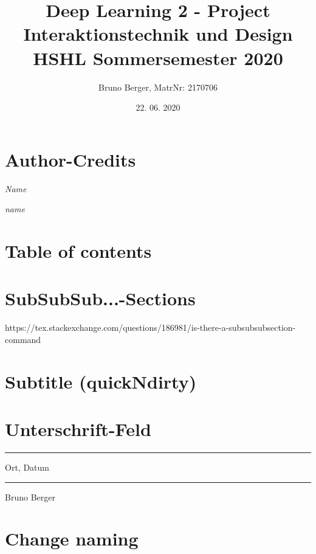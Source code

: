 \section{Author-Credits}

\hfill\textnormal{\emph{Name}}

\begin{flushright}
\emph{name}
\end{flushright}

\section{Table of contents}



\section{SubSubSub...-Sections}

https://tex.stackexchange.com/questions/186981/is-there-a-subsubsubsection-command


\section{Subtitle (quickNdirty)}

\title{Deep Learning 2 - Project\\
    \vspace{+14pt}
        \Large Interaktionstechnik und Design \\
        HSHL  Sommersemester 2020}
\author{Bruno Berger, MatrNr: 2170706}
\date{22. 06. 2020}


\section{Unterschrift-Feld}
\vfill
\parbox{5cm}{
\hrule
\strut Ort, Datum}
\hfill\parbox{6cm}
{\hrule \strut Bruno Berger}

\section{Change naming}
\renewcommand{\abstractname}{Vorwort}

\printbibliography[title = {Literature}]
